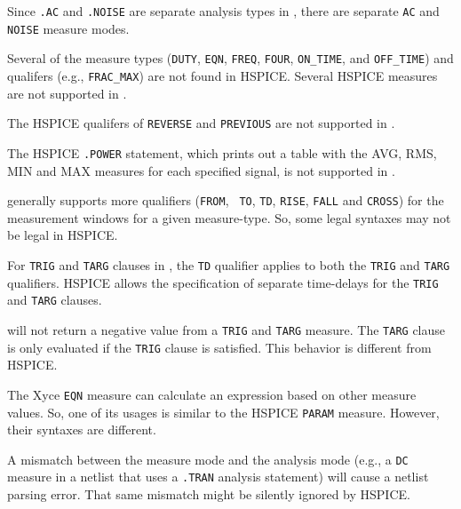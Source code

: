 \begin{XyceItemize}
  \item Since \texttt{.AC} and \texttt{.NOISE} are separate analysis types in
        \Xyce{}, there are separate \texttt{AC} and \texttt{NOISE} measure modes.

  \item Several of the \Xyce{} measure types ({\tt DUTY}, {\tt EQN},
         {\tt FREQ}, {\tt FOUR}, {\tt ON\_TIME}, and {\tt OFF\_TIME})
         and qualifers (e.g., {\tt FRAC\_MAX}) are not found in
         HSPICE.  Several HSPICE measures are not supported
         in \Xyce{}.

  \item The HSPICE qualifers of {\tt REVERSE} and {\tt PREVIOUS} are
  not supported in \Xyce{}.

  \item The HSPICE {\tt .POWER} statement, which prints out a table
        with the AVG, RMS, MIN and MAX measures for each specified
        signal, is not supported in \Xyce{}.

  \item \Xyce{} generally supports more qualifiers ({\tt FROM}, {\tt
        TO}, {\tt TD}, {\tt RISE}, {\tt FALL} and {\tt CROSS}) for the
        measurement windows for a given measure-type.  So, some
        legal \Xyce{} syntaxes may not be legal in HSPICE.

  \item For {\tt TRIG} and {\tt TARG} clauses in \Xyce{}, the {\tt TD}
        qualifier applies to both the {\tt TRIG} and {\tt TARG}
        qualifiers.  HSPICE allows the specification of separate
        time-delays for the {\tt TRIG} and {\tt TARG} clauses.

  \item \Xyce{} will not return a negative value from a {\tt TRIG} and
        {\tt TARG} measure.  The {\tt TARG} clause is only evaluated
        if the {\tt TRIG} clause is satisfied.  This behavior is
        different from HSPICE.

  \item The Xyce {\tt EQN} measure can calculate an expression based
        on other measure values.  So, one of its usages is similar to
        the HSPICE {\tt PARAM} measure.  However, their syntaxes are
        different.

  \item A mismatch between the measure mode and the analysis mode
        (e.g., a {\tt DC} measure in a netlist that uses a {\tt .TRAN}
        analysis statement) will cause a \Xyce{} netlist parsing
        error.  That same mismatch might be silently ignored by
        HSPICE.


\end{XyceItemize}
